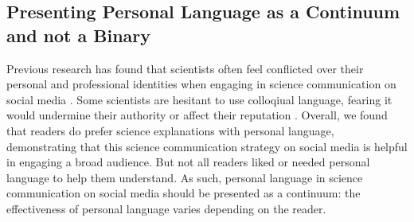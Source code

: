 



\subsection{Presenting Personal Language as a Continuum and not a Binary}

Previous research has found that scientists often feel conflicted over
their personal and professional identities when engaging in science communication on social media \cite{koivumaki2020social}. Some scientists are hesitant to use colloqiual language, fearing it would undermine their authority or affect their reputation \cite{lorono2018responsibility, 10.1145/3479566}. Overall, we found that readers do prefer science explanations with personal language, demonstrating that this science communication strategy on social media is helpful in engaging a broad audience. But not all readers liked or needed personal language to help them understand. As such, personal language in science communication on social media should be presented as a continuum: the effectiveness of personal language varies depending on the reader. 

